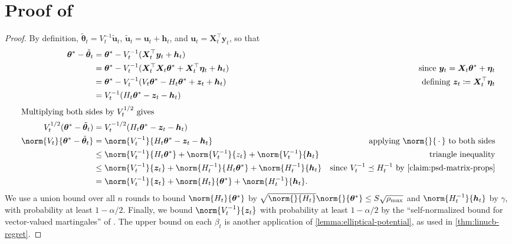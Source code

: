 \documentclass{article}
\renewcommand{\vec}[1]{\bm{#1}}
\newcommand{\wildcard}{\mathinner{\,{\cdot}\,}}
\newcommand{\defeq}{\coloneq}
\newcommand{\inv}[1]{#1^{-1}}
\providecommand\transp{\top}
\let\transpsymbol\transp
\renewcommand{\transp}[1]{#1^\transpsymbol}
\begin{document}



\newpage

\appendix

\section{Proof of }

\CalcBeta*

\begin{proof}
  By definition, $\tilde{\vec\theta}_t = \inv{V_t} \tilde{\vec u}_t$,
  $\tilde{\vec u}_t = \vec u_t + \vec h_t$, and $\vec u_t = \transp{\vec
    X_t} \vec y_t$, so that
  \begin{align*}
    \vec\theta^* - \tilde{\vec\theta}_t
    &= \vec\theta^* - \inv{V_t}(\transp{\vec X_t} \vec y_t + \vec h_t) \\
    &= \vec\theta^* - \inv{V_t}(\transp{\vec X_t} \vec X_t \vec\theta^*
      + \transp{\vec X_t} \vec\eta_t + \vec h_t)
    &\text{since } \vec y_t = \vec X_t \vec\theta^* + \vec\eta_t \\
    &= \vec\theta^* - \inv{V_t}(V_t \vec\theta^* - H_t \vec\theta^* + \vec z_t + \vec h_t)
    &\text{defining } \vec z_t \defeq \transp{\vec X_t} \vec\eta_t \\
    &= \inv{V_t}(H_t\vec\theta^* - \vec z_t - \vec h_t) \\
    \shortintertext{Multiplying both sides by $V_t^{1/2}$ gives}
    V_t^{1/2}(\vec\theta^* - \tilde{\vec\theta}_t)
    &= V_t^{-1/2}(H_t\vec\theta^* - \vec z_t - \vec h_t) \\
    \norm{V_t}{\vec\theta^* - \tilde{\vec\theta}_t}
    &= \norm{\inv{V_t}}{H_t\vec\theta^* - \vec z_t - \vec h_t}
    &\text{applying $\norm{}{\wildcard}$ to both sides}\\
    &\le \norm{\inv{V_t}}{H_t\vec\theta^*} + \norm{\inv{V_t}}{z_t}
      + \norm{\inv{V_t}}{\vec h_t} &\text{triangle inequality} \\
    &\le \norm{\inv{V_t}}{\vec z_t} + \norm{\inv{H_t}}{H_t\vec\theta^*}
      + \norm{\inv{H_t}}{\vec h_t}
    &\text{since $\inv{V_t} \preceq \inv{H_t}$ by \cref{claim:psd-matrix-props}} \\
    &= \norm{\inv{V_t}}{\vec z_t} + \norm{H_t}{\vec\theta^*} +
      \norm{\inv{H_t}}{\vec h_t}.
    &\qedhere
  \end{align*}
  We use a union bound over all $n$ rounds to bound
  $\norm{H_t}{\vec\theta^*}$ by
  $\sqrt{\norm{}{H_t}}\norm{}{\vec\theta^*} \le S\sqrt{\rho_{\max}}$
  and $\norm{\inv{H_t}}{\vec h_t}$ by $\gamma$, with probability at
  least $1-\alpha/2$.  Finally, we bound $\norm{\inv{V_t}}{\vec z_t}$
  with probability at least $1-\alpha/2$ by the ``self-normalized
  bound for vector-valued martingales'' of
  \citet[Theorem~1]{AbbasiYadkoriImprovedAlgorithmsLinear2011}.  The
  upper bound on each $\beta_t$ is another application of
  \cref{lemma:elliptical-potential}, as used in
  \cref{thm:linucb-regret}.
\end{proof}
\end{document}
